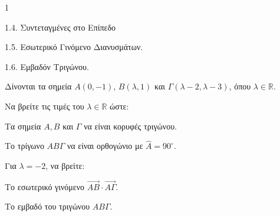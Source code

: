 \begin{ylh}{1}
    \item 1.4. Συντεταγμένες στο Επίπεδο
    \item 1.5. Εσωτερικό Γινόμενο Διανυσμάτων.
    \item 1.6. Εμβαδόν Τριγώνου.
\end{ylh}
Δίνονται τα σημεία $A(0,-1)$, $B(\lambda, 1)$ και $\Gamma(\lambda-2, \lambda-3)$, όπου $\lambda \in \mathbb{R}$.
\begin{alist}
    \item Να βρείτε τις τιμές του $\lambda \in \mathbb{R}$ ώστε:
    \begin{rlist}
        \item Τα σημεία $A, B$ και $\Gamma$ να είναι κορυφές τριγώνου. 
        \item Το τρίγωνο $AB\Gamma$ να είναι ορθογώνιο με $\widehat{A} = 90^\circ$. 
    \end{rlist}
    \item Για $\lambda = -2$, να βρείτε:
    \begin{rlist}
        \item Το εσωτερικό γινόμενο $\vec{AB} \cdot \vec{A\Gamma}$. 
        \item Το εμβαδό του τριγώνου $AB\Gamma$. 
    \end{rlist}
\end{alist}